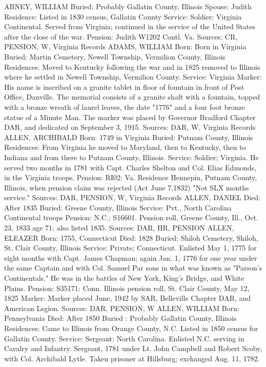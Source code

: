 ABNEY, WILLIAM 
Buried: Probably Gallatin County, Illinois 
Spouse: Judith 
Residence: Listed in 1830 census, Gallatin County 
Service: Soldier; Virginia Continental. Served from Virginia; continued in the service of the United States after the close of the war. 
Pension: Judith W1202 Contl. Va. 
Sources: CR, PENSION, W, Virginia Records 
ADAMS, WILLIAM 
Born: Born in Virginia 
Buried: Martin Cemetery, Newell Township, Vermilion County, Illinois 
Residences: Moved to Kentucky following the war and in 1825 removed to Illinois where he settled in Newell Township, Vermilion County. 
Service: Virginia 
Marker: His name is inscribed on a granite tablet in floor of fountain in front of Post Office, Danville. The memorial consists of a granite shaft with a foun­tain, topped with a bronze wreath of laurel leaves, the date "1776" and a four foot bronze statue of a Minute Man. The marker was placed by Governor Bradford Chapter DAR, and dedicated on September 3, 1915. 
Sources: DAR, W, Virginia Records 
ALLEN, ARCHIBALD 
Born: 1749 in Virginia 
Buried: Putnam County, Illinois 
Residences: From Virginia he moved to Maryland, then to Kentucky, then to 
Indiana and from there to Putnam County, Illinois. 
Service: Soldier; Virginia. He served two months in 1781 with Capt. Charles Shelton and Col. Elias Edmonds, in the Virginia troops. 
Pension: RI02: Va. Residence Hennepin, Putnam County, Illinois, when pension claim was rejected (Act June 7,1832) "Not SLX months service." 
Sources: DAR, PENSION, W, Virginia Records 
ALLEN, DANIEL 
Died: After 1835 
Buried: Greene County, Illinois 
Service: Pvt., North Carolina Continental troops 
Pension: N.C.: S16601. Pension roll, Greene County, Ill., Oct. 23, 1833 age 71; also listed 1835. 
Sources: DAR, HR, PENSION
ALLEN, ELEAZER 
Born: 1755, Connecticut 
Died: 1828 
Buried: Shiloh Cemetery, Shiloh, St. Clair County, Illinois 
Service: Private; Connecticut. Enlisted May 1, 1775 for eight months with Capt. James Chapman; again Jan. 1, 1776 for one year under the same Captain and with Col. Samuel Par sons in what was known as "Parson's Continen­tals." He was in the battles of New York, King's Bridge, and White Plains. 
Pension: S35171: Conn. Illinois pension roll, St. Clair County, May 12, 1825 
Marker: Marker placed June, 1942 by SAR, Belleville Chapter DAR, and Ameri­can Legion. 
Sources: DAR, PENSION, W 
ALLEN, WILLIAM 
Born: Pennsylvania Died: After 1850 
Buried : Probably Gallatin County, Illinois 
Residences: Came to Illinois from Orange County, N.C. Listed in 1850 census for Gallatin County. 
Service: Sergeant: North Carolina. Enlisted N.C. serving in Cavalry and Infantry. Sergeant, 1781 under Lt. John Campbell and Robert Scoby, with Col. Archi­bald Lytle. Taken prisoner at Hillsburg; exchanged Aug. 11, 1782. 
